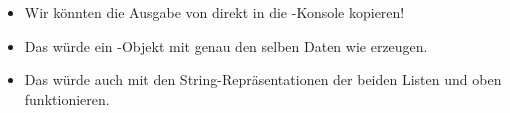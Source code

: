 \documentclass[aspectratio=169,mathserif,notheorems]{beamer}%
\begin{document}
\begin{frame}[t]
{{\begin{itemize}
{}%
%
%
%
\item<31-> Wir könnten die Ausgabe von  direkt in die \python-Konsole kopieren!%
%
\item<32-> Das würde ein -Objekt mit genau den selben Daten wie  erzeugen.%
%
\item<33-> Das würde auch mit den String-Repräsentationen der beiden Listen  und  oben funktionieren.%
\end{itemize}%
}}%
%
%
%
\end{frame}%
%
%
\end{document}
